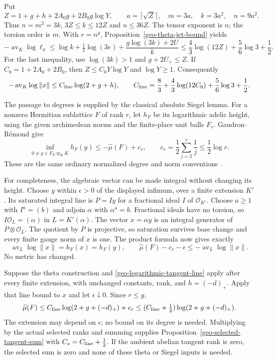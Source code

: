 Put
\[
 Z=1+g+h+2A_0g+2B_0g\log Y,\qquad
 a=\lceil\sqrt Z\rceil,\quad m=3a,\quad k=3a^2,\quad n=9a^2 .
\]
Thus $n=m^2=3k$, $3Z\le k\le12Z$ and $n\le36Z$.
The tensor exponent is $n$; the torsion order is $m$.
With $r=n^g$, Proposition~\ref{geo-theta-jet-bound} yields
\[
 -\operatorname{av}_K\log\ell_\sigma
 \le\log k+\tfrac12\log(3e)+\frac{g\log(3k)+2U}{k}
 \le\frac43\log(12Z)+\frac56\log3+\frac12 .
\]
For the last inequality, use $\log(3k)>1$ and
$g+2U_+\le Z$. If $C_0=1+2A_0+2B_0$, then
$Z\le C_0Y\log Y$ and $\log Y\ge1$. Consequently
\begin{equation}\label{geo-logarithmic-tangent-line}
 -\operatorname{av}_K\log\|x\|
 \le C_{\rm line}\log(2+g+h),\qquad
 C_{\rm line}=\frac83+\frac43\log(12C_0)+\frac56\log3+\frac12 .
\end{equation}

The passage to degrees is supplied by the classical absolute Siegel
lemma. For a nonzero Hermitian sublattice $F$ of rank $r$, let $h_F$
be its logarithmic adelic height, using the given archimedean norms
and the finite-place unit balls $F_v$. Gaudron--R\'emond give
\[
 \inf_{0\ne y\in F_K\otimes_K\overline K}h_F(y)
       \le-\widehat\mu(F)+c_r,\qquad
 c_r=\frac12\sum_{j=2}^r\frac1j\le\frac12\log r .
\]
These are the same ordinary normalized degree and norm conventions
\cite[Sections~2.1--2.3 and Lemma~3.2]{gaudron-remond-minima}.

For completeness, the algebraic vector can be made integral without
changing its height. Choose $y$ within $\epsilon>0$ of the displayed
infimum, over a finite extension $K'$. Its saturated integral line
is $P=Iy$ for a fractional ideal $I$ of $\mathcal O_{K'}$.
Choose $a\ge1$ with $I^a=(b)$ and adjoin $\alpha$ with $\alpha^a=b$.
Fractional ideals have no torsion, so $I\mathcal O_L=(\alpha)$ in
$L=K'(\alpha)$. The vector $x=\alpha y$ is an integral generator
of $P\otimes\mathcal O_L$. The quotient by $P$ is projective,
so saturation survives base change and every finite gauge norm
of $x$ is one. The product formula now gives exactly
\[
 \operatorname{av}_{L}\log\|x\|=h_F(x)=h_F(y),\qquad
 \widehat\mu(F)-c_r-\epsilon
                  \le-\operatorname{av}_{L}\log\|x\| .
\]
No metric has changed.

Suppose the theta construction and \eqref{geo-logarithmic-tangent-line}
apply after every finite extension, with unchanged constants, rank,
and $h=(-d)_+$. Apply that line bound to $x$ and let
$\epsilon\downarrow0$. Since $r\le g$,
\[
 \widehat\mu(F)
 \le C_{\rm line}\log(2+g+(-d)_+)+c_r
 \le(C_{\rm line}+\tfrac12)\log(2+g+(-d)_+).
\]
The extension may depend on $\epsilon$; no bound on its degree is
needed. Multiplying by the actual selected ranks and summing supplies
Proposition~\ref{geo-selected-tangent-sum} with
$C_s=C_{\rm line}+\tfrac12$.
If the ambient abelian tangent rank is zero, the selected sum is zero
and none of these theta or Siegel inputs is needed.

